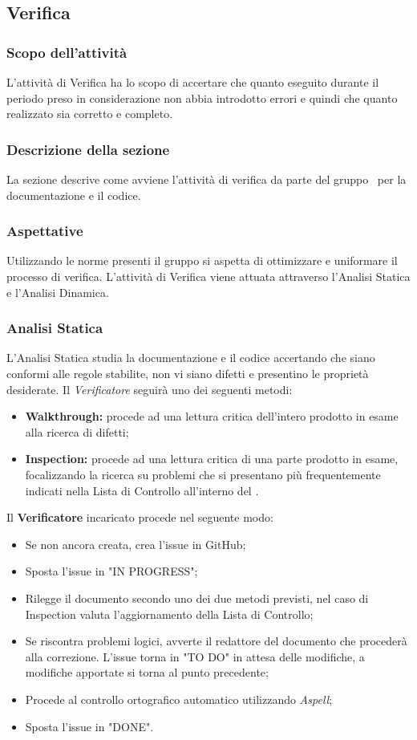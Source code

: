 \subsection{Verifica}\label{Verifica}
\subsubsection{Scopo dell'attività} \label{PSup_Verifica_Scopo}
L'attività di Verifica ha lo scopo di accertare che quanto eseguito durante il periodo preso in considerazione non abbia introdotto errori e quindi che quanto realizzato sia corretto e completo.
\subsubsection{Descrizione della sezione} 
La sezione descrive come avviene l'attività di verifica da parte del gruppo \Gruppo\ per la documentazione e il codice.
\subsubsection{Aspettative}
Utilizzando le norme presenti il gruppo si aspetta di ottimizzare e uniformare il processo di verifica. 
L'attività di Verifica viene attuata attraverso l'Analisi Statica e l'Analisi Dinamica. 
\subsubsection{Analisi Statica}
L'Analisi Statica studia la documentazione e il codice accertando che siano conformi alle regole stabilite, non vi siano difetti e presentino le proprietà desiderate.
Il \textit{Verificatore} seguirà uno dei seguenti metodi:
\begin{itemize}
	\item \textbf{Walkthrough:} procede ad una lettura critica dell'intero prodotto in esame alla ricerca di difetti;
	\item \textbf{Inspection:} procede ad una lettura critica di una parte prodotto in esame, focalizzando la ricerca su problemi che si presentano più frequentemente indicati nella Lista di Controllo all'interno del \PdQv{}.
\end{itemize}

Il \textbf{Verificatore} incaricato procede nel seguente modo:
\begin{itemize}
	\item Se non ancora creata, crea l'issue in GitHub;
	\item Sposta l'issue in "IN PROGRESS";
	\item Rilegge il documento secondo uno dei due metodi previsti, nel caso di Inspection valuta l'aggiornamento della Lista di Controllo;
	\item Se riscontra problemi logici, avverte il redattore del documento che procederà alla correzione.  L'issue torna in "TO DO" in attesa delle modifiche, a modifiche apportate si torna al punto precedente;
	\item Procede al controllo ortografico automatico utilizzando \textit{Aspell};
	\item Sposta l'issue in "DONE".
\end{itemize}


